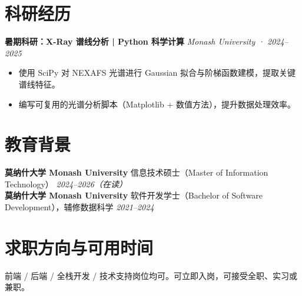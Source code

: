 \documentclass[a4paper,10pt]{article}
\begin{document}
\section*{科研经历}

\textbf{暑期科研：X-Ray 谱线分析 | Python 科学计算} \hfill \textit{Monash University · 2024–2025}
\begin{itemize}
    \item 使用 SciPy 对 NEXAFS 光谱进行 Gaussian 拟合与阶梯函数建模，提取关键谱线特征。
    \item 编写可复用的光谱分析脚本（Matplotlib + 数值方法），提升数据处理效率。
\end{itemize}

\section*{教育背景}

\textbf{莫纳什大学 Monash University} 信息技术硕士（Master of Information Technology） \hfill \textit{2024–2026（在读）} \\
\textbf{莫纳什大学 Monash University} 软件开发学士（Bachelor of Software Development），辅修数据科学 \hfill \textit{2021–2024}

\section*{求职方向与可用时间}
前端 / 后端 / 全栈开发 / 技术支持岗位均可。可立即入岗，可接受全职、实习或兼职。
\end{document}
